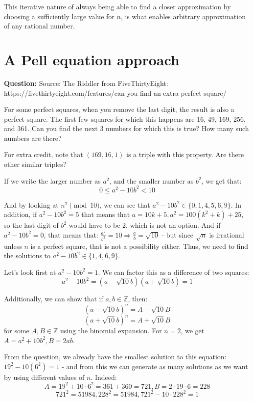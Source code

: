 \documentclass{article}
\renewcommand{\implies}{\Rightarrow}
\begin{document}
This iterative nature of always being able to find a closer approximation by choosing a sufficiently
large value for $n$, is what enables arbitrary approximation of any rational number.

\section{A Pell equation approach}

\textbf{Question:} Source: The Riddler from FiveThirtyEight: 
https://fivethirtyeight.com/features/can-you-find-an-extra-perfect-square/

For some perfect squares, when you remove the last digit, the result is also a perfect square. The
first few squares for which this happens are 16, 49, 169, 256, and 361. Can you find the next 3
numbers for which this is true? How many such numbers are there?

For extra credit, note that $(169,16,1)$ is a triple with this property. Are
there other similar triples?

If we write the larger number as $a^2$, and the smaller number as $b^2$, we get that:
\[ 0 \leq a^2 - 10b^2 < 10 \]

And by looking at $n^2 \pmod{10}$, we can see that $a^2 - 10b^2 \in \{0,1,4,5,6,9\}$.
In addition, if $a^2-10b^2 = 5$ that means that $a=10k+5, a^2 = 100(k^2+k) + 25$, so the last
digit of $b^2$ would have to be 2, which is not an option. And if $a^2-10b^2 = 0$, that means that:
$\frac{a^2}{b^2} = 10 \implies \frac{a}{b} = \sqrt{10}$ - but since $\sqrt{n}$ is irrational unless
$n$ is a perfect square, that is not a possibility either. Thus, we need to find the solutions to
$a^2 - 10b^2 \in \{1,4,6,9\}$.

Let's look first at $a^2-10b^2 = 1$.  We can factor this as a difference of two squares:
\[ a^2 - 10b^2 = (a-\sqrt{10}b)(a+\sqrt{10}b) = 1 \]

Additionally, we can show that if $a,b \in \mathbb{Z}$, then:
\[ (a-\sqrt{10}b)^n = A - \sqrt{10}B \]
\[ (a+\sqrt{10}b)^n = A + \sqrt{10}B \]
for some $A,B \in \mathbb{Z}$ using the binomial expansion. For $n=2$, we get $A=a^2+10b^2, B=2ab$.

From the question, we already have the smallest solution to this equation: $19^2 - 10(6^2) = 1$ - 
and from this we can generate as many solutions as we want by using different values of $n$. Indeed:
\[A = 19^2 + 10\cdot 6^2 = 361 + 360 = 721,  B = 2 \cdot 19 \cdot 6 = 228 \]
\[ 721^2 = 51984, 228^2 = 51984, 721^2 - 10\cdot 228^2 = 1 \]
\end{document}
